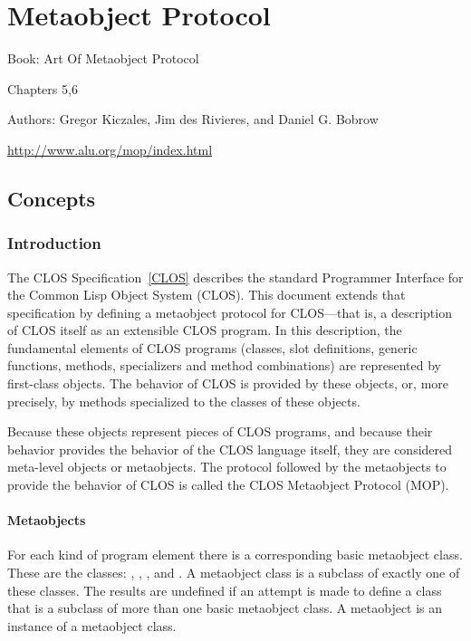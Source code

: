 \clearpage\def\pagestatus{FINAL PROOF}

\chapter{Metaobject Protocol}
\label{METAOBJECT-PROTOCOL}

Book: Art Of Metaobject Protocol

Chapters 5,6

Authors: Gregor Kiczales, Jim des Rivieres, and Daniel G. Bobrow

\href{http://www.alu.org/mop/index.html}{http://www.alu.org/mop/index.html}

\section{Concepts}

\subsection{Introduction}

The CLOS Specification~\ref{CLOS} describes the standard Programmer Interface for the
Common Lisp Object System (CLOS). This document extends that specification by
defining a metaobject protocol for CLOS---that is, a description of CLOS itself
as an extensible CLOS program. In this description, the fundamental elements of
CLOS programs (classes, slot definitions, generic functions, methods,
specializers and method combinations) are represented by first-class
objects. The behavior of CLOS is provided by these objects, or, more precisely,
by methods specialized to the classes of these objects.

Because these objects represent pieces of CLOS programs, and because their
behavior provides the behavior of the CLOS language itself, they are considered
meta-level objects or metaobjects. The protocol followed by the metaobjects to
provide the behavior of CLOS is called the CLOS Metaobject Protocol (MOP). 

\subsubsection{Metaobjects}

For each kind of program element there is a corresponding basic metaobject
class. These are the classes: , ,
,  
and . A metaobject class is a subclass of exactly one of these
classes. The results are undefined if an attempt is made to define a class that
is a subclass of more than one basic metaobject class. A metaobject is an
instance of a metaobject class. 

